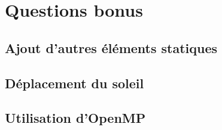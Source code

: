 \documentclass[a4paper,11pt]{report}
\begin{document}
	\pagebreak
	\section{Questions bonus}
	\subsection{Ajout d'autres éléments statiques}
	
	\subsection{Déplacement du soleil}
	
	\subsection{Utilisation d'OpenMP}
		
	
\end{document}
